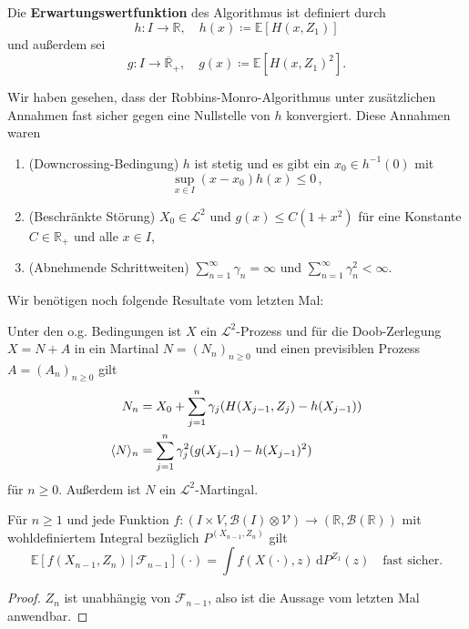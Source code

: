 \documentclass[ngerman,a4paper,11pt]{scrartcl}
\newcommand{\EE}{\mathbb{E}}
\newcommand{\RR}{\mathbb{R}}
\newcommand{\bb}{\mathcal{B}}
\newcommand{\ff}{\mathcal{F}}
\renewcommand{\ll}{\mathcal{L}}
\newcommand{\vv}{\mathcal{V}}
\newcommand{\zspace}{V}
\newcommand{\zsigma}{\vv}
\newcommand{\expect}[1]{\EE[#1]}
\newcommand{\condexp}[2]{\EE[#1\,|\,#2]}
\newcommand{\dvar}[1]{\,\mathrm{d}#1}
\DeclarePairedDelimiter{\sprod}{\langle}{\rangle}	%
\begin{document}
Die \textbf{Erwartungswertfunktion} des Algorithmus ist definiert durch
\begin{equation*}
 h:I\to\RR,\quad h(x)\coloneqq\expect{H(x,Z_1)}
\end{equation*}
und außerdem sei
\begin{equation*}
 g:I\to\overline{\RR}_+,\quad g(x)\coloneqq\expect{H(x,Z_1)^2}.
\end{equation*}

\begin{rem}
  \label{rem:11.2}
  Wir haben gesehen, dass der Robbins-Monro-Algorithmus unter zusätzlichen
  Annahmen fast sicher gegen eine Nullstelle von $h$ konvergiert. Diese Annahmen
  waren
  \begin{enumerate}[label=(\alph*)]
  \item (Downcrossing-Bedingung) $h$ ist stetig und es gibt ein $x_0\in
    h^{-1}(0)$ mit
    \begin{equation*}
      \sup_{x\in I}(x-x_0)h(x)\leq 0\,,
    \end{equation*}
  \item (Beschränkte Störung) $X_0\in\ll^2$ und $g(x)\leq C(1+x^2)$ für eine
    Konstante $C\in\RR_+$ und alle $x\in I$,\label{rem:beschr}
  \item (Abnehmende Schrittweiten) $\sum_{n=1}^\infty \gamma_n=\infty$ und
    $\sum_{n=1}^\infty\gamma_n^2<\infty$.
  \end{enumerate}
\end{rem}
Wir benötigen noch folgende Resultate vom letzten Mal:
\begin{lem}\label{lem:doob}
 Unter den o.g. Bedingungen ist $X$ ein $\ll^2$-Prozess und für die
 Doob-Zerlegung $X=N+A$ in ein Martinal $N=(N_n)_{n\geq 0}$ und einen
 previsiblen Prozess $A=(A_n)_{n\geq 0}$ gilt
 \begin{align*}
  N_n&=X_0+\sum_{j=1}^n\gamma_j(H(X_{j-1},Z_j)-h(X_{j-1})) \\
  \sprod{N}_n&=\sum_{j=1}^n\gamma_j^2(g(X_{j-1})-h(X_{j-1})^2)
 \end{align*}
 für $n\geq 0$. Außerdem ist $N$ ein $\ll^2$-Martingal.
\end{lem}
\begin{lem}
 Für $n\geq 1$ und jede Funktion $f:(I\times \zspace,\bb(I)\otimes\zsigma)\to(\RR,\bb(\RR))$ mit
 wohldefiniertem Integral bezüglich $P^{(X_{n-1},Z_n)}$ gilt
 \begin{equation*}
  \condexp{f(X_{n-1}, Z_n)}{\ff_{n-1}}(\cdot)=\int f(X(\cdot), z)\dvar{P^{Z_1}(z)}\quad\text{fast sicher.}
 \end{equation*}
\end{lem}
\begin{proof}
 $Z_n$  ist unabhängig von $\ff_{n-1}$, also ist die Aussage vom letzten Mal anwendbar.
\end{proof}
\end{document}
